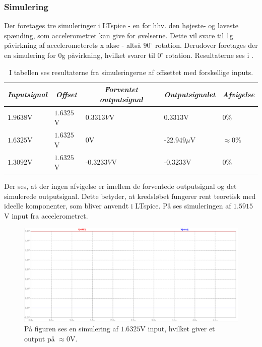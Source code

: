 \subsubsection{Simulering}
Der foretages tre simuleringer i LTspice - en for hhv. den højeste- og laveste spænding, som accelerometret kan give for øvelserne. Dette vil svare til 1g påvirkning af accelerometerets x akse - altså $90^{\circ}$ rotation. Derudover foretages der en simulering for 0g påvirkning, hvilket svarer til $0^{\circ}$ rotation. Resultaterne ses i .
\begin{table}[H]
	\centering
	\begin{tabular}{|l|l|l|l|l|}
		\hline
		\multicolumn{1}{|c|}{\textit{Inputsignal}} & \multicolumn{1}{c|}{\textit{Offset}} & \multicolumn{1}{c|}{\textit{Forventet outputsignal}} & \multicolumn{1}{c|}{\textit{Outputsignalet}} & \multicolumn{1}{c|}{\textit{Afvigelse}} \\ \hline
		$1.9638$V     & $1.6325$V    & $0.3313V$V    & $0.3313$V       & $0$\%              \\ \hline
		$1.6325$V     & $1.6325$V    & $0$V          & -$22.949\mu$V   & $\approx 0$\%      \\ \hline
		$1.3092$V     & $1.6325$V    & -$0.3233V$V   & -$0.3233$V      & $0$\%                \\ \hline
	\end{tabular}
	\caption{I tabellen ses resultaterne fra simuleringerne af offsettet med forskellige inputs.}
	\label{Tab:offset_sim}
\end{table}
\noindent Der ses, at der ingen afvigelse er imellem de forventede outputsignal og det simulerede outputsignal. Dette betyder, at kredsløbet fungerer rent teoretisk med ideelle komponenter, som bliver anvendt i LTspice. På  ses simuleringen af $1.5915$V input fra accelerometret.
 
\begin{figure}[H]
\centering
\includegraphics[scale=0.4]{figures/cProblemloesning/Offset_simulering.png}
\caption{På figuren ses en simulering af $1.6325$V input, hvilket giver et output på $\approx 0$V.}
\label{fig:Offset_simulering}
\end{figure}

